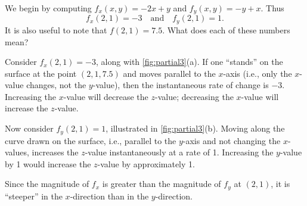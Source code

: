 {We begin by computing $f_x(x,y) = -2x+y$ and $f_y(x,y) = -y+x$. Thus
$$f_x(2,1) = -3 \quad \text{and}\quad f_y(2,1) = 1.$$
It is also useful to note that $f(2,1) = 7.5$. What does each of these numbers mean?

Consider $f_x(2,1)=-3$, along with \autoref{fig:partial3}(a). If one ``stands'' on the surface at the point $(2,1,7.5)$ and moves parallel to the $x$-axis (i.e., only the $x$-value changes, not the $y$-value), then the instantaneous rate of change is $-3$. Increasing the $x$-value will decrease the $z$-value; decreasing the $x$-value will increase the $z$-value.


Now consider $f_y(2,1)=1$, illustrated in \autoref{fig:partial3}(b). Moving along the curve drawn on the surface, i.e., parallel to the $y$-axis and not changing the $x$-values, increases the $z$-value instantaneously at a rate of 1. Increasing the $y$-value by 1 would increase the $z$-value by approximately 1.

Since the magnitude of $f_x$ is greater than the magnitude of $f_y$ at $(2,1)$, it is ``steeper'' in the $x$-direction than in the $y$-direction.}


